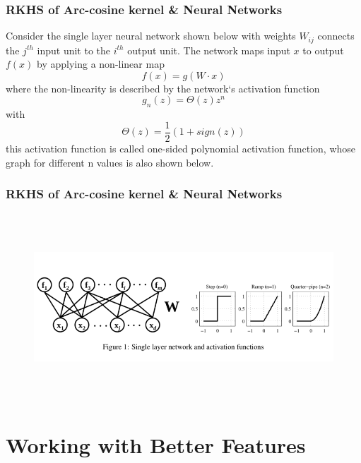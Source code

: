 \documentclass{beamer}
\begin{document}
\begin{frame}
\frametitle{RKHS of Arc-cosine kernel \& Neural Networks}
Consider the single layer neural network shown below with weights $W_{ij}$ connects the $j^{th}$ input unit to the $i^{th}$ output unit. The network maps input $x$ to output $f(x)$ by applying a non-linear map 
\[ f(x) = g(W \cdot x) \]
where the non-linearity is described by the network`s activation function
\[g_n(z) = \Theta(z)z^n \]
with 
\[ \Theta(z) = \frac{1}{2}(1+sign(z)) \]
this activation function is called one-sided polynomial activation function, whose graph for different n values is also shown below.
\end{frame}

\begin{frame}
\frametitle{RKHS of Arc-cosine kernel \& Neural Networks}
\begin{figure}
\includegraphics[width=1.0\linewidth, height=7cm]{figures/neuralnet}
\end{figure}
\end{frame}


\section{Working with Better Features}
\end{document}
